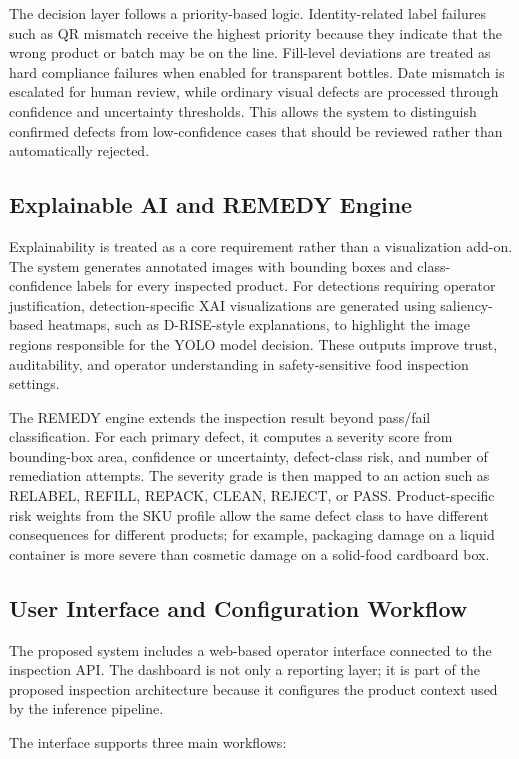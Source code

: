 \documentclass{ieeeaccess}
\begin{document}
The decision layer follows a priority-based logic. Identity-related label failures such as QR mismatch receive the highest priority because they indicate that the wrong product or batch may be on the line. Fill-level deviations are treated as hard compliance failures when enabled for transparent bottles. Date mismatch is escalated for human review, while ordinary visual defects are processed through confidence and uncertainty thresholds. This allows the system to distinguish confirmed defects from low-confidence cases that should be reviewed rather than automatically rejected.

\subsection{Explainable AI and REMEDY Engine}
Explainability is treated as a core requirement rather than a visualization add-on. The system generates annotated images with bounding boxes and class-confidence labels for every inspected product. For detections requiring operator justification, detection-specific XAI visualizations are generated using saliency-based heatmaps, such as D-RISE-style explanations, to highlight the image regions responsible for the YOLO model decision. These outputs improve trust, auditability, and operator understanding in safety-sensitive food inspection settings.

The REMEDY engine extends the inspection result beyond pass/fail classification. For each primary defect, it computes a severity score from bounding-box area, confidence or uncertainty, defect-class risk, and number of remediation attempts. The severity grade is then mapped to an action such as RELABEL, REFILL, REPACK, CLEAN, REJECT, or PASS. Product-specific risk weights from the SKU profile allow the same defect class to have different consequences for different products; for example, packaging damage on a liquid container is more severe than cosmetic damage on a solid-food cardboard box.

\subsection{User Interface and Configuration Workflow}
The proposed system includes a web-based operator interface connected to the inspection API. The dashboard is not only a reporting layer; it is part of the proposed inspection architecture because it configures the product context used by the inference pipeline.

The interface supports three main workflows:
\end{document}
